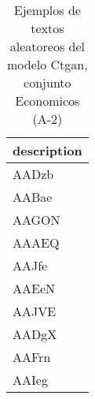 \begin{table}[H]
\centering
\fontsize{8}{14}\selectfont
\caption{Ejemplos de textos aleatoreos del modelo Ctgan, conjunto Economicos (A-2)}
\label{table-sample10-economicos-a-2-ctgan-text}
\begin{tabular}{|m{50em}|}
\hline
\rowcolor[gray]{0.8}
description \\
\hline AADzb \\
\hline AABae \\
\hline AAGON \\
\hline AAAEQ \\
\hline AAJfe \\
\hline AAEeN \\
\hline AAJVE \\
\hline AADgX \\
\hline AAFrn \\
\hline AAIeg \\
\hline
\end{tabular}
\end{table}

